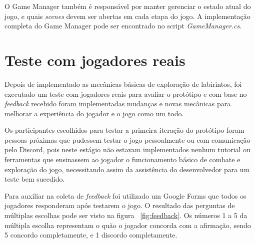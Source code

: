 	O Game Manager também é responsável por manter gerenciar o estado atual do jogo, e quais \emph{scenes} devem ser abertas em cada etapa do jogo. A implementação completa do Game Manager pode ser encontrado no script \emph{GameManager.cs}.
	
\section{Teste com jogadores reais}

	Depois de implementado as mecânicas básicas de exploração de labirintos, foi executado um teste com jogadores reais para avaliar o protótipo e com base no \emph{feedback} recebido foram implementadas mudanças e novas mecânicas para melhorar a experiência do jogador e o jogo como um todo.
	
	Os participantes escolhidos para testar a primeira iteração do protótipo foram pessoas próximas que pudessem testar o jogo pessoalmente ou com comunicação pelo Discord, pois neste estágio não estavam implementados nenhum tutorial ou ferramentas que ensinassem ao jogador o funcionamento básico de combate e exploração do jogo, necessitando assim da assistência do desenvolvedor para um teste bem sucedido.

	Para auxiliar na coleta de \emph{feedback} foi utilizado um Google Forms que todos os jogadores responderam após testarem o jogo. O resultado das perguntas de múltiplas escolhas pode ser visto na figura ~\ref{fig:feedback}. Os números 1 a 5 da múltipla escolha representam o quão o jogador concorda com a afirmação, sendo 5 concordo completamente, e 1 discordo completamente.
\pagebreak

